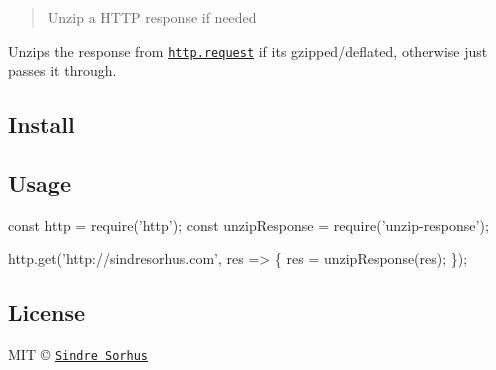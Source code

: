 \begin{quote}
Unzip a H\+T\+TP response if needed \end{quote}


Unzips the response from \href{https://nodejs.org/api/http.html#http_http_request_options_callback}{\tt {\ttfamily http.\+request}} if it\textquotesingle{}s gzipped/deflated, otherwise just passes it through.

\subsection*{Install}




\subsection*{Usage}


\begin{DoxyCode}
const http = require('http');
const unzipResponse = require('unzip-response');

http.get('http://sindresorhus.com', res => \{
    res = unzipResponse(res);
\});
\end{DoxyCode}


\subsection*{License}

M\+IT © \href{https://sindresorhus.com}{\tt Sindre Sorhus} 